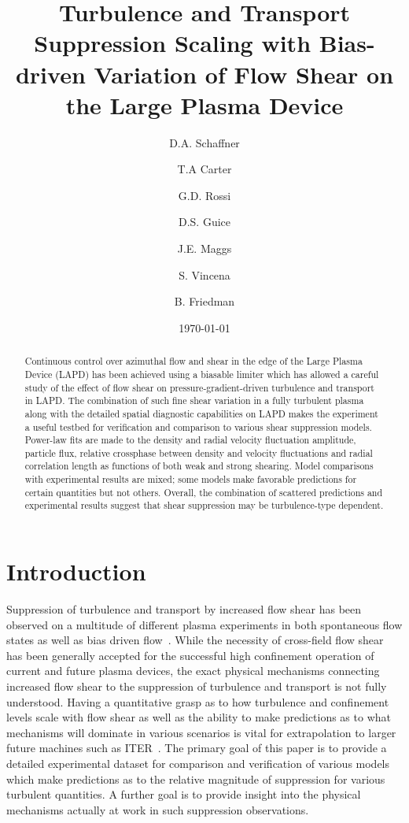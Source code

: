 \documentclass[aip,pop,amsmath,amssymb,reprint,superscriptaddress]{revtex4-1} %
\begin{document}
\title{Turbulence and Transport Suppression Scaling with Bias-driven Variation of Flow Shear on the Large Plasma Device}
\author{D.A. Schaffner}
\author{T.A Carter}
\author{G.D. Rossi}
\author{D.S. Guice}
\author{J.E. Maggs}
\author{S. Vincena}
\author{B. Friedman}
\date{\today}
\begin{abstract}
Continuous control over azimuthal flow and shear in the edge of the Large Plasma Device (LAPD) has been achieved using a biasable limiter which has allowed a careful study of the effect of flow shear on pressure-gradient-driven turbulence and transport in LAPD. The combination of such fine shear variation in a fully turbulent plasma along with the detailed spatial diagnostic capabilities on LAPD makes the experiment a useful testbed for verification and comparison to various shear suppression models. Power-law fits are made to the density and radial velocity fluctuation amplitude, particle flux, relative crossphase between density and velocity fluctuations and radial correlation length as functions of both weak and strong shearing. Model comparisons with experimental results are mixed; some models make favorable predictions for certain quantities but not others. Overall, the combination of scattered predictions and experimental results suggest that shear suppression may be turbulence-type dependent.
\end{abstract}
\maketitle

\section{Introduction}

Suppression of turbulence and transport by increased flow shear has been observed on a multitude of different plasma experiments in both spontaneous flow states as well as bias driven flow~\cite{burrell99,oost03,sakai93}. While the necessity of cross-field flow shear has been generally accepted for the successful high confinement operation of current and future plasma devices, the exact physical mechanisms connecting increased flow shear to the suppression of turbulence and transport is not fully understood. Having a quantitative grasp as to how turbulence and confinement levels scale with flow shear as well as the ability to make predictions as to what mechanisms will dominate in various scenarios is vital for extrapolation to larger future machines such as ITER~\cite{burrell97,terry00}. The primary goal of this paper is to provide a detailed experimental dataset for comparison and verification of various models which make predictions as to the relative magnitude of suppression for various turbulent quantities. A further goal is to provide insight into the physical mechanisms actually at work in such suppression observations.
\end{document}
